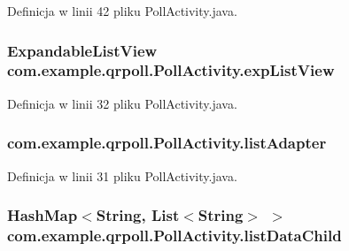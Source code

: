 Definicja w linii 42 pliku Poll\+Activity.\+java.

\hypertarget{classcom_1_1example_1_1qrpoll_1_1_poll_activity_a45d9887fce62772f80726024d1775f7d}{
\subsubsection[{exp\+List\+View}]{\setlength{\rightskip}{0pt plus 5cm}Expandable\+List\+View com.\+example.\+qrpoll.\+Poll\+Activity.\+exp\+List\+View\hspace{0.3cm}{\ttfamily [package]}}}\label{classcom_1_1example_1_1qrpoll_1_1_poll_activity_a45d9887fce62772f80726024d1775f7d}


Definicja w linii 32 pliku Poll\+Activity.\+java.

\hypertarget{classcom_1_1example_1_1qrpoll_1_1_poll_activity_aeedb4d35f1bb56db80b834a5c5da4f44}{
\subsubsection[{list\+Adapter}]{ com.\+example.\+qrpoll.\+Poll\+Activity.\+list\+Adapter\hspace{0.3cm}{\ttfamily [package]}}}\label{classcom_1_1example_1_1qrpoll_1_1_poll_activity_aeedb4d35f1bb56db80b834a5c5da4f44}


Definicja w linii 31 pliku Poll\+Activity.\+java.

\hypertarget{classcom_1_1example_1_1qrpoll_1_1_poll_activity_ab607bec81e729232d72cee9db8ffdc73}{
\subsubsection[{list\+Data\+Child}]{\setlength{\rightskip}{0pt plus 5cm}Hash\+Map$<$String, List$<$String$>$ $>$ com.\+example.\+qrpoll.\+Poll\+Activity.\+list\+Data\+Child\hspace{0.3cm}{\ttfamily [package]}}}\label{classcom_1_1example_1_1qrpoll_1_1_poll_activity_ab607bec81e729232d72cee9db8ffdc73}


